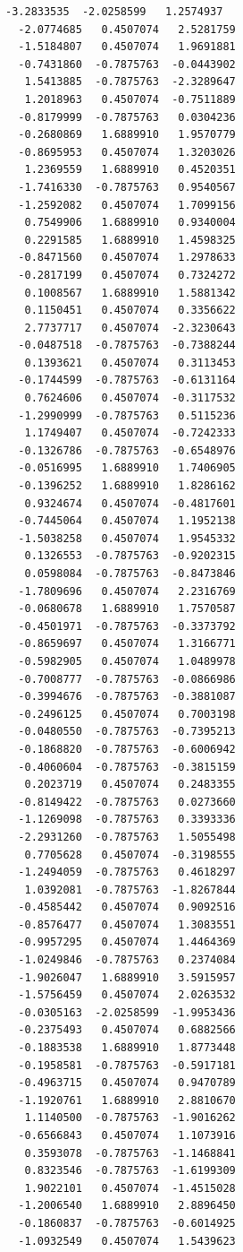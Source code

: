 \documentclass[11pt]{article}
\begin{document}
\begin{Verbatim}[commandchars=\\\{\}]
  -3.2833535  -2.0258599   1.2574937
  -2.0774685   0.4507074   2.5281759
  -1.5184807   0.4507074   1.9691881
  -0.7431860  -0.7875763  -0.0443902
   1.5413885  -0.7875763  -2.3289647
   1.2018963   0.4507074  -0.7511889
  -0.8179999  -0.7875763   0.0304236
  -0.2680869   1.6889910   1.9570779
  -0.8695953   0.4507074   1.3203026
   1.2369559   1.6889910   0.4520351
  -1.7416330  -0.7875763   0.9540567
  -1.2592082   0.4507074   1.7099156
   0.7549906   1.6889910   0.9340004
   0.2291585   1.6889910   1.4598325
  -0.8471560   0.4507074   1.2978633
  -0.2817199   0.4507074   0.7324272
   0.1008567   1.6889910   1.5881342
   0.1150451   0.4507074   0.3356622
   2.7737717   0.4507074  -2.3230643
  -0.0487518  -0.7875763  -0.7388244
   0.1393621   0.4507074   0.3113453
  -0.1744599  -0.7875763  -0.6131164
   0.7624606   0.4507074  -0.3117532
  -1.2990999  -0.7875763   0.5115236
   1.1749407   0.4507074  -0.7242333
  -0.1326786  -0.7875763  -0.6548976
  -0.0516995   1.6889910   1.7406905
  -0.1396252   1.6889910   1.8286162
   0.9324674   0.4507074  -0.4817601
  -0.7445064   0.4507074   1.1952138
  -1.5038258   0.4507074   1.9545332
   0.1326553  -0.7875763  -0.9202315
   0.0598084  -0.7875763  -0.8473846
  -1.7809696   0.4507074   2.2316769
  -0.0680678   1.6889910   1.7570587
  -0.4501971  -0.7875763  -0.3373792
  -0.8659697   0.4507074   1.3166771
  -0.5982905   0.4507074   1.0489978
  -0.7008777  -0.7875763  -0.0866986
  -0.3994676  -0.7875763  -0.3881087
  -0.2496125   0.4507074   0.7003198
  -0.0480550  -0.7875763  -0.7395213
  -0.1868820  -0.7875763  -0.6006942
  -0.4060604  -0.7875763  -0.3815159
   0.2023719   0.4507074   0.2483355
  -0.8149422  -0.7875763   0.0273660
  -1.1269098  -0.7875763   0.3393336
  -2.2931260  -0.7875763   1.5055498
   0.7705628   0.4507074  -0.3198555
  -1.2494059  -0.7875763   0.4618297
   1.0392081  -0.7875763  -1.8267844
  -0.4585442   0.4507074   0.9092516
  -0.8576477   0.4507074   1.3083551
  -0.9957295   0.4507074   1.4464369
  -1.0249846  -0.7875763   0.2374084
  -1.9026047   1.6889910   3.5915957
  -1.5756459   0.4507074   2.0263532
  -0.0305163  -2.0258599  -1.9953436
  -0.2375493   0.4507074   0.6882566
  -0.1883538   1.6889910   1.8773448
  -0.1958581  -0.7875763  -0.5917181
  -0.4963715   0.4507074   0.9470789
  -1.1920761   1.6889910   2.8810670
   1.1140500  -0.7875763  -1.9016262
  -0.6566843   0.4507074   1.1073916
   0.3593078  -0.7875763  -1.1468841
   0.8323546  -0.7875763  -1.6199309
   1.9022101   0.4507074  -1.4515028
  -1.2006540   1.6889910   2.8896450
  -0.1860837  -0.7875763  -0.6014925
  -1.0932549   0.4507074   1.5439623

\end{Verbatim}
\end{document}

